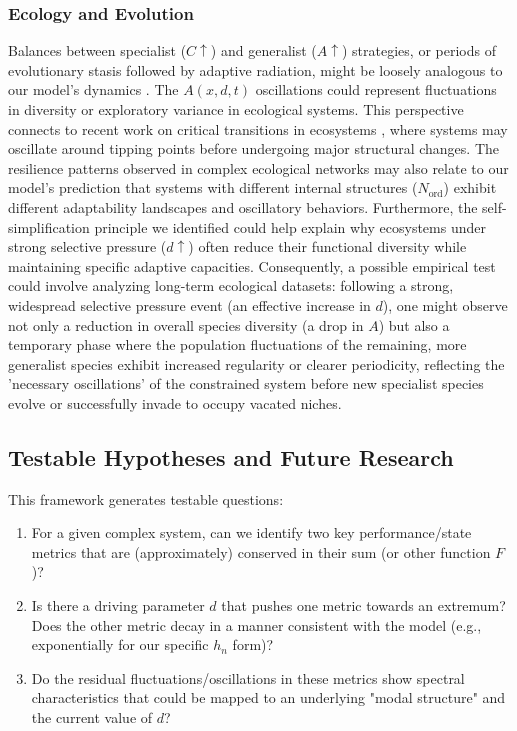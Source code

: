 \documentclass[11pt,a4paper]{article}
\begin{document}
\subsubsection{Ecology and Evolution}
Balances between specialist ($C \uparrow$) and generalist ($A \uparrow$) strategies, or periods of evolutionary stasis followed by adaptive radiation, might be loosely analogous to our model's dynamics \cite{Whitacre2010}. The $A(x,d,t)$ oscillations could represent fluctuations in diversity or exploratory variance in ecological systems. This perspective connects to recent work on critical transitions in ecosystems \cite{Scheffer2009,Scheffer2012}, where systems may oscillate around tipping points before undergoing major structural changes. The resilience patterns observed in complex ecological networks \cite{Gao2016} may also relate to our model's prediction that systems with different internal structures ($N_{\text{ord}}$) exhibit different adaptability landscapes and oscillatory behaviors. Furthermore, the self-simplification principle we identified could help explain why ecosystems under strong selective pressure ($d \uparrow$) often reduce their functional diversity while maintaining specific adaptive capacities. Consequently, a possible empirical test could involve analyzing long-term ecological datasets: following a strong, widespread selective pressure event (an effective increase in $d$), one might observe not only a reduction in overall species diversity (a drop in $A$) but also a temporary phase where the population fluctuations of the remaining, more generalist species exhibit increased regularity or clearer periodicity, reflecting the 'necessary oscillations' of the constrained system before new specialist species evolve or successfully invade to occupy vacated niches.

\subsection{Testable Hypotheses and Future Research}

This framework generates testable questions:
\begin{enumerate}
    \item For a given complex system, can we identify two key performance/state metrics that are (approximately) conserved in their sum (or other function $F$)?
    \item Is there a driving parameter $d$ that pushes one metric towards an extremum? Does the other metric decay in a manner consistent with the model (e.g., exponentially for our specific $h_n$ form)?
    \item Do the residual fluctuations/oscillations in these metrics show spectral characteristics that could be mapped to an underlying "modal structure" and the current value of $d$?
\end{enumerate}
\end{document}
